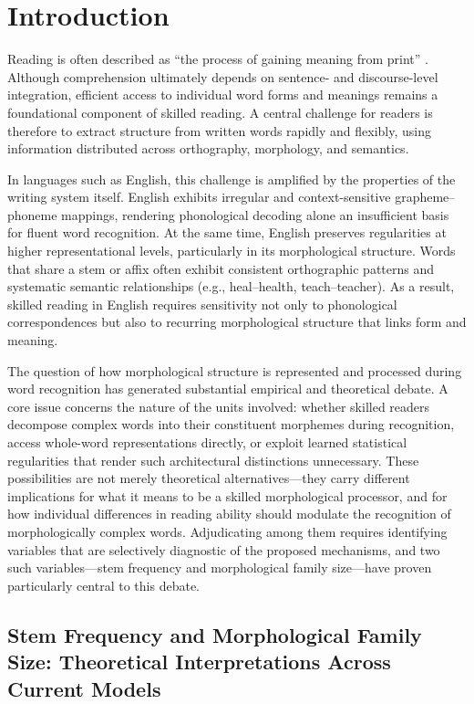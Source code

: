 \documentclass[utf8]{FrontiersinHarvard} %
\begin{document}
\section{Introduction}

Reading is often described as “the process of gaining meaning from print” \citep[][p.~34]{raynerHowPsychologicalScience2001}. Although comprehension ultimately depends on sentence- and discourse-level integration, efficient access to individual word forms and meanings remains a foundational component of skilled reading. A central challenge for readers is therefore to extract structure from written words rapidly and flexibly, using information distributed across orthography, morphology, and semantics.

In languages such as English, this challenge is amplified by the properties of the writing system itself. English exhibits irregular and context-sensitive grapheme–phoneme mappings, rendering phonological decoding alone an insufficient basis for fluent word recognition. At the same time, English preserves regularities at higher representational levels, particularly in its morphological structure. Words that share a stem or affix often exhibit consistent orthographic patterns and systematic semantic relationships (e.g., heal–health, teach–teacher). As a result, skilled reading in English requires sensitivity not only to phonological correspondences but also to recurring morphological structure that links form and meaning.

The question of how morphological structure is represented and processed during word recognition has generated substantial empirical and theoretical debate. A core issue concerns the nature of the units involved: whether skilled readers decompose complex words into their constituent morphemes during recognition, access whole-word representations directly, or exploit learned statistical regularities that render such architectural distinctions unnecessary. These possibilities are not merely theoretical alternatives—they carry different implications for what it means to be a skilled morphological processor, and for how individual differences in reading ability should modulate the recognition of morphologically complex words. Adjudicating among them requires identifying variables that are selectively diagnostic of the proposed mechanisms, and two such variables—stem frequency and morphological family size—have proven particularly central to this debate.

\subsection{Stem Frequency and Morphological Family Size: Theoretical Interpretations Across Current Models}
\end{document}
